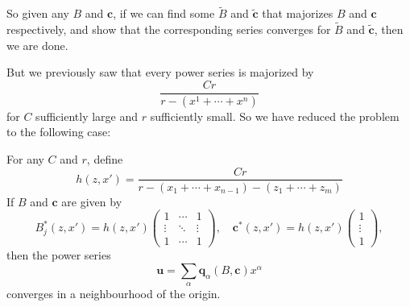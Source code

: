 \documentclass[a4paper]{article}
\begin{document}
%
%
%
%

So given any $B$ and $\mathbf{c}$, if we can find some $\tilde{B}$ and $\tilde{\mathbf{c}}$ that majorizes $B$ and $\mathbf{c}$ respectively, and show that the corresponding series converges for $\tilde{B}$ and $\tilde{\mathbf{c}}$, then we are done.

But we previously saw that every power series is majorized by
\[
  \frac{Cr}{r - (x^1 + \cdots + x^n)}
\]
for $C$ sufficiently large and $r$ sufficiently small. So we have reduced the problem to the following case:
\begin{lemma}
  For any $C$ and $r$, define
  \[
    h(z, x') = \frac{Cr}{r - (x_1 + \cdots + x_{n - 1}) - (z_1 + \cdots + z_m)}
  \]
  If $B$ and $\mathbf{c}$ are given by
  \[
    B^*_j(z, x') = h(z, x') \begin{pmatrix}
      1 & \cdots & 1\\
      \vdots & \ddots & \vdots\\
      1 & \cdots & 1
    \end{pmatrix},\quad \mathbf{c}^*(z, x') = h(z, x')
    \begin{pmatrix}
      1 \\ \vdots \\ 1
    \end{pmatrix},
  \]
  then the power series
  \[
    \mathbf{u} = \sum_{\alpha} \mathbf{q}_\alpha(B, \mathbf{c}) x^\alpha
  \]
  converges in a neighbourhood of the origin.
\end{lemma}
\end{document}
